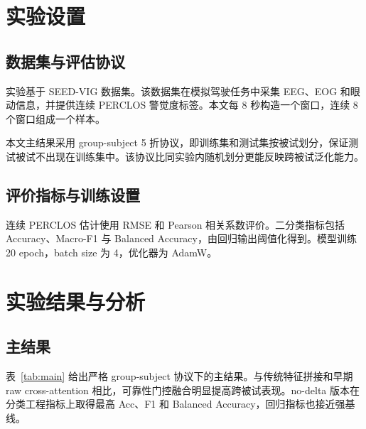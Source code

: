 \documentclass[UTF8,a4paper,10.5pt,fontset=windows]{ctexart}
\begin{document}
\section{实验设置}
\subsection{数据集与评估协议}
实验基于 SEED-VIG 数据集。该数据集在模拟驾驶任务中采集 EEG、EOG 和眼动信息，并提供连续 PERCLOS 警觉度标签\cite{seedvig,zheng2017}。本文每 8 秒构造一个窗口，连续 8 个窗口组成一个样本。

本文主结果采用 group-subject 5 折协议，即训练集和测试集按被试划分，保证测试被试不出现在训练集中。该协议比同实验内随机划分更能反映跨被试泛化能力。

\subsection{评价指标与训练设置}
连续 PERCLOS 估计使用 RMSE 和 Pearson 相关系数评价。二分类指标包括 Accuracy、Macro-F1 与 Balanced Accuracy，由回归输出阈值化得到。模型训练 20 epoch，batch size 为 4，优化器为 AdamW。

\section{实验结果与分析}
\subsection{主结果}
表~\ref{tab:main} 给出严格 group-subject 协议下的主结果。与传统特征拼接和早期 raw cross-attention 相比，可靠性门控融合明显提高跨被试表现。no-delta 版本在分类工程指标上取得最高 Acc、F1 和 Balanced Accuracy，回归指标也接近强基线。

\begin{table}[H]
\centering
\caption{主结果（group-subject, binary, 5 折均值）。}
\label{tab:main}
\end{table}
\end{document}
